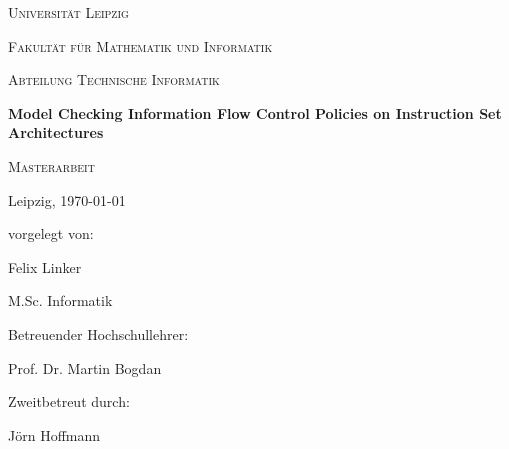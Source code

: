 \documentclass{securem}
\begin{document}
\begin{titlepage}
    \centering
    \par
    \vspace{1cm}
    {\scshape\LARGE Universität Leipzig} \par
    \vspace{0.3cm}
    {\scshape\Large Fakultät für Mathematik und Informatik} \par
    {\scshape\Large Abteilung Technische Informatik} \par
    \vspace{2.3cm}
    {\huge\bfseries Model Checking Information Flow Control Policies on Instruction Set Architectures} \par
    \vspace{1.5cm}
    {\scshape\Large Masterarbeit} \par
    \vspace{0.3cm}
    {\large Leipzig, \today} \par
    \vspace {1.5cm}
    {
        vorgelegt von: \par
        Felix Linker \par
        M.Sc. Informatik
    }
    \vfill
    \begin{multicols}{2}
        Betreuender Hochschullehrer: \par
        Prof. Dr. Martin Bogdan \par
        \columnbreak
        Zweitbetreut durch: \par
        Jörn Hoffmann
    \end{multicols}
\end{titlepage}

\newpage

\tableofcontents
\thispagestyle{empty}

\newpage

\setcounter{page}{1}











\printbibliography
\end{document}
